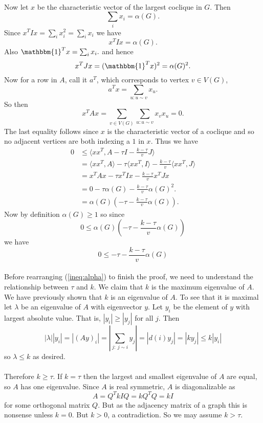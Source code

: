 \documentclass[letterpaper,12pt,oneside,onecolumn]{article}
\newcommand{\1}{\mathbbm{1}}
\begin{document}
\paragraph{}
Now let $x$ be the characteristic vector of the largest coclique in $G$. Then 
$$\sum_{i} x_i = \alpha(G).$$
Since $x^TIx = \sum_{i} x_i^2 = \sum_{i} x_i$ we have
$$x^TIx = \alpha(G).$$
Also $\1^Tx = \sum_{i} x_i.$ and hence
$$x^TJx = (\1^Tx)^2 = \alpha(G)^2.$$
Now for a row in $A$, call it $a^T$, which corresponds to vertex $v \in V(G)$,
$$a^Tx = \sum_{u: u\sim v} x_u.$$
So then
$$x^T A x = \sum_{v \in V(G)} \sum_{u:u\sim v} x_v x_u = 0.$$
The last equality follows since $x$ is the characteristic vector of a coclique and so no adjacent vertices are both indexing a $1$ in $x$.
Thus we have
\begin{align*}
0 &\leq \langle xx^T, A - \tau I - \frac{k - \tau}{v} J \rangle \\
&= \langle xx^T,A\rangle - \tau \langle xx^T, I \rangle - \frac{k - \tau}{v} \langle xx^T, J \rangle \\
&= x^TAx - \tau x^TIx -\frac{k - \tau}{v} x^TJ x \\
&= 0 - \tau \alpha(G) - \frac{k -\tau}{v} \alpha (G)^2. \\
&= \alpha(G)(-\tau - \frac{k-\tau}{v} \alpha(G)).
\end{align*}
Now by definition $\alpha(G) \geq 1$ so since 
$$ 0 \leq \alpha(G)(-\tau - \frac{k-\tau}{v} \alpha(G))$$
we have
\begin{equation}
0 \leq -\tau - \frac{k-\tau}{v} \alpha(G) \label{ineq:alpha}\end{equation}
\paragraph{}
Before rearranging (\ref{ineq:alpha}) to finish the proof, we need to understand the relationship between $\tau$ and $k$. We claim that $k$ is the maximum eigenvalue of $A$. We have previously shown that $k$ is an eigenvalue of $A$. To see that it is maximal let $\lambda$ be an eigenvalue of $A$ with eigenvector $y$. Let $y_i$ be the element of $y$ with largest absolute value. That is, $|y_i| \geq |y_j|$ for all $j$. Then
$$ |\lambda| |y_i| = |(Ay)_i| = |\sum_{j:\ j \sim i} y_j| = |d(i) y_j| = |k y_j| \leq k|y_i|$$
so $\lambda \leq k$ as desired.
\paragraph{}
Therefore $k \geq \tau$. If $k = \tau$ then the largest and smallest eigenvalue of $A$ are equal, so $A$ has one eigenvalue. Since $A$ is real symmetric, $A$ is diagonalizable as
$$A = Q^T k I Q = kQ^TQ = kI$$
for some orthogonal matrix $Q$. But as the adjacency matrix of a graph this is nonsense unless $k = 0$. But $k > 0$, a contradiction. So we may assume $k > \tau$.
\end{document}
